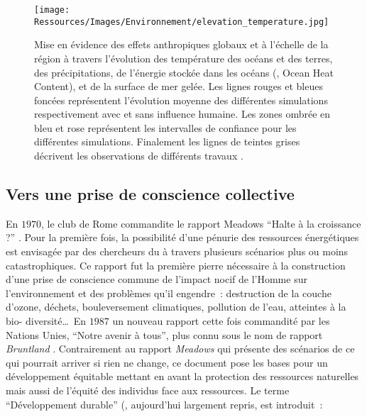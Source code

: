 \begin{figure}
    \centering
    \texttt{[image: Ressources/Images/Environnement/elevation\_temperature.jpg]}
    \caption[Mise en évidence des effets anthropiques globaux et à l’échelle de la région]
            {Mise en évidence des effets anthropiques globaux et à l’échelle de la région
             à travers l’évolution des température des océans et des terres, des précipitations,
             de l’énergie stockée dans les océans (, Ocean Heat Content), et
             de la surface de mer gelée. Les lignes rouges et bleues foncées représentent l’évolution moyenne
             des différentes simulations respectivement avec et sans influence humaine. Les zones
             ombrée en bleu et rose représentent les intervalles de confiance pour les différentes
             simulations. Finalement les lignes de teintes grises décrivent les observations
             de différents travaux \parencite{AchutaRao2013}.}
    \label{fig:evolution_climat}
\end{figure}

\subsection{Vers une prise de conscience collective} %
\label{sub:vers_une_prise_de_conscience_collective}
En $1970$, le club de Rome commandite le rapport Meadows \enquote{Halte à la croissance ?}
\parencite{Meadows1972}. Pour la première fois, la possibilité d’une pénurie des
ressources énergétiques est envisagée par des chercheurs du  à travers plusieurs
scénarios plus ou moins catastrophiques. Ce rapport fut la première pierre nécessaire à la
construction d’une prise de conscience commune de l’impact nocif de l’Homme sur l’environnement
et des problèmes qu’il engendre~: destruction de la couche d’ozone,
déchets, bouleversement climatiques, pollution de l’eau, atteintes à la bio-
diversité\dots\ En $1987$ un nouveau rapport cette fois commandité par les Nations Unies,
\enquote{Notre avenir à tous}, plus connu sous le nom de rapport \textit{Bruntland} \parencite{Brundtland1987}.
Contrairement au rapport \textit{Meadows} qui présente des scénarios de ce qui pourrait
arriver si rien ne change, ce document pose les bases pour un développement équitable
mettant en avant la protection des ressources naturelles mais aussi de l’équité des
individus face aux ressources. Le terme \enquote{Développement durable}
(, aujourd’hui largement repris, est introduit~:


